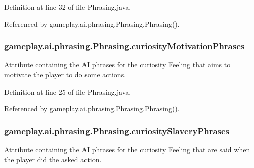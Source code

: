 Definition at line 32 of file Phrasing.\-java.



Referenced by gameplay.\-ai.\-phrasing.\-Phrasing.\-Phrasing().

\hypertarget{classgameplay_1_1ai_1_1phrasing_1_1_phrasing_ad82ede6d0263d91e13511606f6696a18}{
\subsubsection[{curiosity\-Motivation\-Phrases}]{ gameplay.\-ai.\-phrasing.\-Phrasing.\-curiosity\-Motivation\-Phrases\hspace{0.3cm}{\ttfamily [protected]}}}\label{classgameplay_1_1ai_1_1phrasing_1_1_phrasing_ad82ede6d0263d91e13511606f6696a18}


Attribute containing the \hyperlink{classgameplay_1_1ai_1_1_a_i}{A\-I} phrases for the curiosity Feeling that aims to motivate the player to do some actions. 



Definition at line 25 of file Phrasing.\-java.



Referenced by gameplay.\-ai.\-phrasing.\-Phrasing.\-Phrasing().

\hypertarget{classgameplay_1_1ai_1_1phrasing_1_1_phrasing_a2e35ff33685cec980af1454e7f255d06}{
\subsubsection[{curiosity\-Slavery\-Phrases}]{ gameplay.\-ai.\-phrasing.\-Phrasing.\-curiosity\-Slavery\-Phrases\hspace{0.3cm}{\ttfamily [protected]}}}\label{classgameplay_1_1ai_1_1phrasing_1_1_phrasing_a2e35ff33685cec980af1454e7f255d06}


Attribute containing the \hyperlink{classgameplay_1_1ai_1_1_a_i}{A\-I} phrases for the curiosity Feeling that are said when the player did the asked action. 



